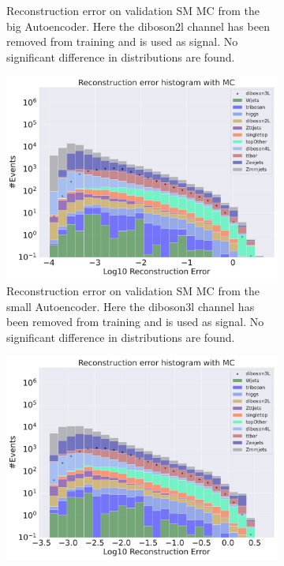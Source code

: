 \begin{figure}[h!]
\begin{subfigure}{.45\textwidth}
        \caption{Reconstruction error on validation SM MC from the big Autoencoder. Here the diboson2l channel has been removed from training and 
        is used as signal. No significant difference in distributions are found. }
        \label{fig:ae_big_diboson2l}
    \end{subfigure}
    \hfill 
    \begin{subfigure}{.45\textwidth}
        \includegraphics[width=\textwidth]{Figures/AE_testing/small/b_data_recon_big_rm3_feats_sig_diboson3l.pdf}
        \caption{Reconstruction error on validation SM MC from the small Autoencoder. Here the diboson3l channel has been removed from training and 
        is used as signal. No significant difference in distributions are found. }
        \label{fig:ae_small_diboson3l}
    \end{subfigure}
    \hfill
    \begin{subfigure}{.45\textwidth}
        \includegraphics[width=\textwidth]{Figures/AE_testing/big/b_data_recon_big_rm3_feats_sig_diboson3l.pdf}

\end{subfigure}
\end{figure}
